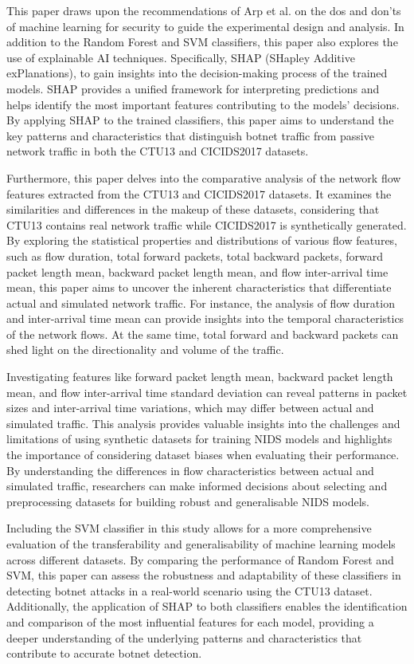 This paper draws upon the recommendations of Arp et al.\cite{arp2022and} on the dos and don'ts of machine learning for security to guide the experimental design and analysis. In addition to the Random Forest and SVM classifiers, this paper also explores the use of explainable AI techniques. Specifically, SHAP (SHapley Additive exPlanations)\cite{lundberg2017unified}, to gain insights into the decision-making process of the trained models. SHAP provides a unified framework for interpreting predictions and helps identify the most important features contributing to the models' decisions. By applying SHAP to the trained classifiers, this paper aims to understand the key patterns and characteristics that distinguish botnet traffic from passive network traffic in both the CTU13 and CICIDS2017 datasets.

Furthermore, this paper delves into the comparative analysis of the network flow features extracted from the CTU13 and CICIDS2017 datasets. It examines the similarities and differences in the makeup of these datasets, considering that CTU13 contains real network traffic while CICIDS2017 is synthetically generated. By exploring the statistical properties and distributions of various flow features, such as flow duration, total forward packets, total backward packets, forward packet length mean, backward packet length mean, and flow inter-arrival time mean, this paper aims to uncover the inherent characteristics that differentiate actual and simulated network traffic. For instance, the analysis of flow duration and inter-arrival time mean can provide insights into the temporal characteristics of the network flows. At the same time, total forward and backward packets can shed light on the directionality and volume of the traffic.

Investigating features like forward packet length mean, backward packet length mean, and flow inter-arrival time standard deviation can reveal patterns in packet sizes and inter-arrival time variations, which may differ between actual and simulated traffic. This analysis provides valuable insights into the challenges and limitations of using synthetic datasets for training NIDS models and highlights the importance of considering dataset biases when evaluating their performance. By understanding the differences in flow characteristics between actual and simulated traffic, researchers can make informed decisions about selecting and preprocessing datasets for building robust and generalisable NIDS models.

Including the SVM classifier in this study allows for a more comprehensive evaluation of the transferability and generalisability of machine learning models across different datasets. By comparing the performance of Random Forest and SVM, this paper can assess the robustness and adaptability of these classifiers in detecting botnet attacks in a real-world scenario using the CTU13 dataset. Additionally, the application of SHAP to both classifiers enables the identification and comparison of the most influential features for each model, providing a deeper understanding of the underlying patterns and characteristics that contribute to accurate botnet detection.


